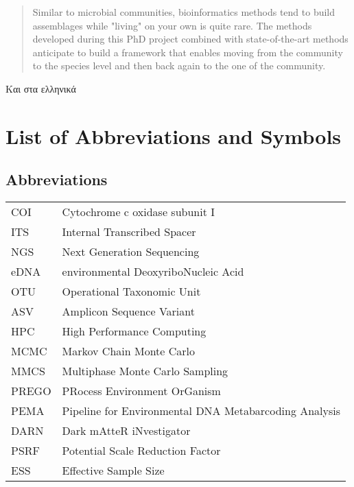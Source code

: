 \documentclass[master=elt, cleveref, autoref, masteroption=eg]{kulemt}
\begin{document}
\begin{abstract}
   Similar to microbial communities, bioinformatics methods tend to build assemblages while 
   "living" on your own is quite rare. 
   The methods developed during this PhD project combined with state-of-the-art methods
   anticipate to build a framework  that enables
   moving from the community to the species level and then back again to the one of the community. 

\end{abstract}


\begin{abstract*}

   Και στα ελληνικά
   
\end{abstract*}

\listoffiguresandtables

\chapter{List of Abbreviations and Symbols}

\section*{Abbreviations}
\begin{flushleft}
  \renewcommand{\arraystretch}{1.1}
  \begin{tabularx}{\textwidth}{@{}p{12mm}X@{}}
    COI   & Cytochrome c oxidase subunit I \\
    ITS   & Internal Transcribed Spacer \\
    NGS   & Next Generation Sequencing \\
    eDNA  & environmental DeoxyriboNucleic Acid \\
    OTU   & Operational Taxonomic Unit \\
    ASV   & Amplicon Sequence Variant \\
    HPC   & High Performance Computing \\
    MCMC  & Markov Chain Monte Carlo \\
    MMCS  & Multiphase Monte Carlo Sampling \\
    PREGO & PRocess Environment OrGanism \\
    PEMA  & Pipeline for Environmental DNA Metabarcoding Analysis \\
    DARN  & Dark mAtteR iNvestigator \\
    PSRF  & Potential Scale Reduction Factor \\
    ESS   & Effective Sample Size \\
    
  \end{tabularx}
\end{flushleft}
\end{document}
